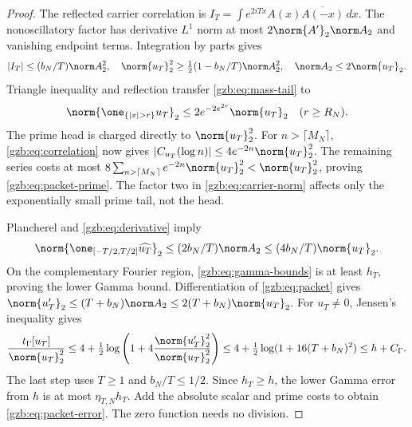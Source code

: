 \documentclass[11pt,a4paper]{article}
\numberwithin{equation}{section}
\theoremstyle{definition}\newtheorem{definition}[theorem]{Definition}
\theoremstyle{remark}\newtheorem{remark}[theorem]{Remark}
\newcommand{\tg}{t_\Gamma}\newcommand{\cg}{c_\Gamma}
\begin{document}
\begin{proof}
The reflected carrier correlation is
$I_T=\int e^{2iTx}A(x)\overline{A(-x)}\,dx$.
The nonoscillatory factor has derivative $L^1$ norm at most
$2\norm{A'}_2\norm A_2$ and vanishing endpoint terms.
Integration by parts gives
\begin{equation}\label{gzb:eq:carrier-norm}
 |I_T|\le(b_N/T)\norm A_2^2,\quad
 \norm{u_T}_2^2\ge\tfrac12(1-b_N/T)\norm A_2^2,\quad
 \norm A_2\le2\norm{u_T}_2.
\end{equation}
Triangle inequality and reflection transfer \eqref{gzb:eq:mass-tail} to
\[
 \norm{\one_{\{|x|>r\}}u_T}_2
       \le2e^{-2e^{2r}}\norm{u_T}_2\quad(r\ge R_N).
\]
The prime head is charged directly to $\norm{u_T}_2^2$.
For $n>\lceil M_N\rceil$, \eqref{gzb:eq:correlation} now gives
$|C_{u_T}(\log n)|\le4e^{-2n}\norm{u_T}_2^2$.
The remaining series costs at most
$8\sum_{n>\lceil M_N\rceil}e^{-2n}\norm{u_T}_2^2
 <\norm{u_T}_2^2$, proving \eqref{gzb:eq:packet-prime}.
The factor two in \eqref{gzb:eq:carrier-norm} affects only the
exponentially small prime tail, not the head.

Plancherel and \eqref{gzb:eq:derivative} imply
\[
 \norm{\one_{[-T/2,T/2]}\widehat{u_T}}_2
      \le(2b_N/T)\norm A_2\le(4b_N/T)\norm{u_T}_2.
\]
On the complementary Fourier region, \eqref{gzb:eq:gamma-bounds} is at least
$h_T$, proving the lower Gamma bound.
Differentiation of \eqref{gzb:eq:packet} gives
$\norm{u_T'}_2\le(T+b_N)\norm A_2
                  \le2(T+b_N)\norm{u_T}_2$.
For $u_T\ne0$, Jensen's inequality gives
\[
 \frac{\tg[u_T]}{\norm{u_T}_2^2}
 \le4+\tfrac12\log\left(1+4\frac{\norm{u_T'}_2^2}{\norm{u_T}_2^2}\right)
 \le4+\tfrac12\log(1+16(T+b_N)^2)\le h+C_\Gamma.
\]
The last step uses $T\ge1$ and $b_N/T\le1/2$.
Since $h_T\ge h$, the lower Gamma error from $h$ is at most
$\eta_{T,N}h_T$. Add the absolute scalar and prime costs to obtain
\eqref{gzb:eq:packet-error}. The zero function needs no division.
\end{proof}
\end{document}
